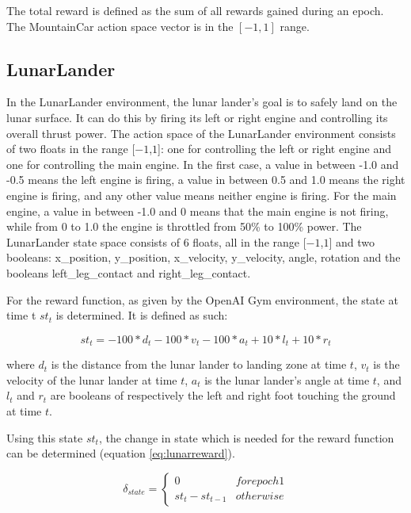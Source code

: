 The total reward is defined as the sum of all rewards gained during an epoch. The MountainCar action space vector is in the $[-1,1]$ range. 

\subsection{LunarLander}
In the LunarLander environment, the lunar lander's goal is to safely land on the lunar surface. It can do this by firing its left or right engine and controlling its overall thrust power. The action space of the LunarLander environment consists of two floats in the range [$-1$,$1$]: one for controlling the left or right engine and one for controlling the main engine. In the first case, a value in between -1.0 and -0.5 means the left engine is firing, a value in between 0.5 and 1.0 means the right engine is firing, and any other value means neither engine is firing. For the main engine, a value in between -1.0 and 0 means that the main engine is not firing, while from 0 to 1.0 the engine is throttled from 50\% to 100\% power. The LunarLander state space consists of 6 floats, all in the range [$-1$,$1$] and two booleans: x\_position, y\_position, x\_velocity, y\_velocity, angle, rotation and the booleans left\_leg\_contact and right\_leg\_contact.  

For the reward function, as given by the OpenAI Gym environment, the state at time t $st_t$ is determined. It is defined as such:

\begin{equation} 
    st_t = -100 * d_t - 100 * v_t - 100 * a_t + 10*l_t + 10*r_t
\end{equation}

where $d_t$ is the distance from the lunar lander to landing zone at time $t$, $v_t$ is the velocity of the lunar lander at time $t$, $a_t$ is the lunar lander's angle at time $t$, and $l_t$ and $r_t$ are booleans of respectively the left and right foot touching the ground at time $t$.  

Using this state $st_t$, the change in state which is needed for the reward function can be determined (equation \ref{eq:lunarreward}). 

\begin{equation}
    \delta _{state} =
    \begin{cases*}
      0  & for epoch 1 \\
      st_t - st _{t-1} & otherwise 
    \end{cases*}
\end{equation}

